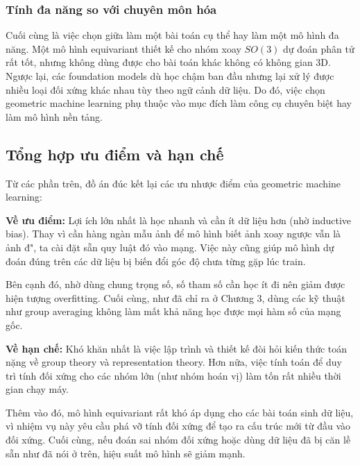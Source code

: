\subsubsection{Tính đa năng so với chuyên môn hóa}

Cuối cùng là việc chọn giữa làm một bài toán cụ thể hay làm một mô hình đa năng. Một mô hình equivariant thiết kế cho nhóm xoay $SO(3)$ dự đoán phân tử rất tốt, nhưng không dùng được cho bài toán khác không có không gian 3D. Ngược lại, các foundation models dù học chậm ban đầu nhưng lại xử lý được nhiều loại đối xứng khác nhau tùy theo ngữ cảnh dữ liệu. Do đó, việc chọn geometric machine learning phụ thuộc vào mục đích làm công cụ chuyên biệt hay làm mô hình nền tảng.

\subsection{Tổng hợp ưu điểm và hạn chế}
\label{subsec:uu-nhuoc-diem}

Từ các phần trên, đồ án đúc kết lại các ưu nhược điểm của geometric machine learning:

\textbf{Về ưu điểm:} Lợi ích lớn nhất là học nhanh và cần ít dữ liệu hơn (nhờ inductive bias). Thay vì cần hàng ngàn mẫu ảnh để mô hình biết ảnh xoay ngược vẫn là ảnh đ", ta cài đặt sẵn quy luật đó vào mạng. Việc này cũng giúp mô hình dự đoán đúng trên các dữ liệu bị biến đổi góc độ chưa từng gặp lúc train. 

Bên cạnh đó, nhờ dùng chung trọng số, số tham số cần học ít đi nên giảm được hiện tượng overfitting. Cuối cùng, như đã chỉ ra ở Chương 3, dùng các kỹ thuật như group averaging không làm mất khả năng học được mọi hàm số của mạng gốc.

\textbf{Về hạn chế:} Khó khăn nhất là việc lập trình và thiết kế đòi hỏi kiến thức toán nặng về group theory và representation theory. Hơn nữa, việc tính toán để duy trì tính đối xứng cho các nhóm lớn (như nhóm hoán vị) làm tốn rất nhiều thời gian chạy máy. 

Thêm vào đó, mô hình equivariant rất khó áp dụng cho các bài toán sinh dữ liệu, vì nhiệm vụ này yêu cầu phá vỡ tính đối xứng để tạo ra cấu trúc mới từ đầu vào đối xứng. Cuối cùng, nếu đoán sai nhóm đối xứng hoặc dùng dữ liệu đã bị căn lề sẵn như đã nói ở trên, hiệu suất mô hình sẽ giảm mạnh.

